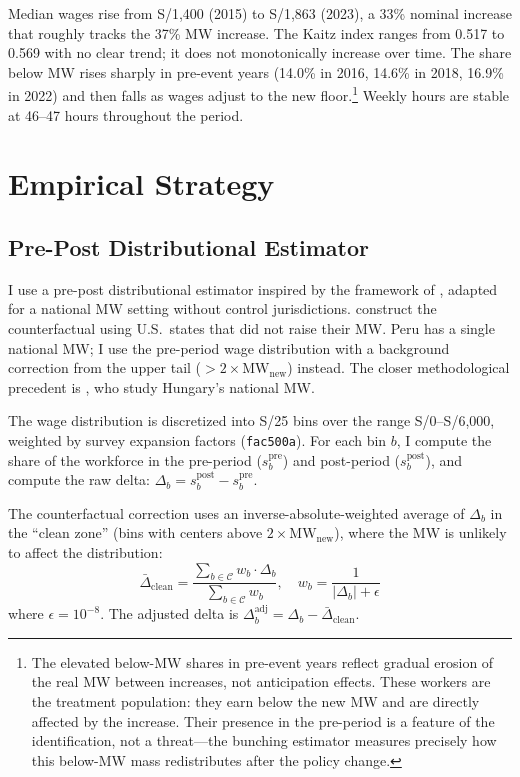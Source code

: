 \documentclass[12pt]{article}
\begin{document}
Median wages rise from S/1,400 (2015) to S/1,863 (2023), a 33\% nominal increase that roughly tracks the 37\% MW increase. The Kaitz index ranges from 0.517 to 0.569 with no clear trend; it does not monotonically increase over time. The share below MW rises sharply in pre-event years (14.0\% in 2016, 14.6\% in 2018, 16.9\% in 2022) and then falls as wages adjust to the new floor.\footnote{The elevated below-MW shares in pre-event years reflect gradual erosion of the real MW between increases, not anticipation effects. These workers are the treatment population: they earn below the new MW and are directly affected by the increase. Their presence in the pre-period is a feature of the identification, not a threat---the bunching estimator measures precisely how this below-MW mass redistributes after the policy change.} Weekly hours are stable at 46--47 hours throughout the period.

\section{Empirical Strategy}\label{sec:strategy}

\subsection{Pre-Post Distributional Estimator}\label{sec:bunching}

I use a pre-post distributional estimator inspired by the framework of \citet{cengiz2019}, adapted for a national MW setting without control jurisdictions. \citet{cengiz2019} construct the counterfactual using U.S.\ states that did not raise their MW. Peru has a single national MW; I use the pre-period wage distribution with a background correction from the upper tail ($>2 \times \text{MW}_\text{new}$) instead. The closer methodological precedent is \citet{harasztosi2016}, who study Hungary's national MW.

The wage distribution is discretized into S/25 bins over the range S/0--S/6,000, weighted by survey expansion factors (\texttt{fac500a}). For each bin $b$, I compute the share of the workforce in the pre-period ($s_b^\text{pre}$) and post-period ($s_b^\text{post}$), and compute the raw delta: $\Delta_b = s_b^\text{post} - s_b^\text{pre}$.

The counterfactual correction uses an inverse-absolute-weighted average of $\Delta_b$ in the ``clean zone'' (bins with centers above $2 \times \text{MW}_\text{new}$), where the MW is unlikely to affect the distribution:
\[
\bar{\Delta}_\text{clean} = \frac{\sum_{b \in \mathcal{C}} w_b \cdot \Delta_b}{\sum_{b \in \mathcal{C}} w_b}, \quad w_b = \frac{1}{|\Delta_b| + \epsilon}
\]
where $\epsilon = 10^{-8}$. The adjusted delta is $\Delta_b^\text{adj} = \Delta_b - \bar{\Delta}_\text{clean}$.
\end{document}
